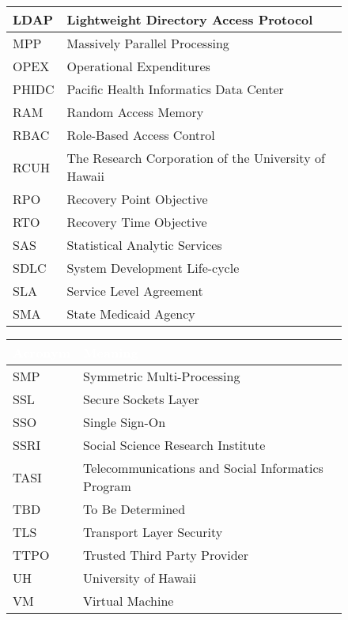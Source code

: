 \begin{figure}[H]
\begin{center}
\begin{tabular}{|>{\raggedright\arraybackslash}l 
                    |>{\raggedright\arraybackslash}l 
                    |}
    LDAP & Lightweight Directory Access Protocol\\\hline
    MPP & Massively Parallel Processing\\\hline
    OPEX & Operational Expenditures \\\hline
    PHIDC & Pacific Health Informatics Data Center\\\hline
    RAM & Random Access Memory\\\hline
    RBAC & Role-Based Access Control\\\hline
    RCUH & The Research Corporation of the University of Hawaii\\\hline
    RPO & Recovery Point Objective\\\hline
    RTO & Recovery Time Objective\\\hline
    SAS & Statistical Analytic Services\\\hline
    SDLC & System Development Life-cycle\\\hline
    SLA & Service Level Agreement \\\hline
    SMA & State Medicaid Agency\\\hline
    \end{tabular}
\end{center}
\label{AcronymsI}
\end{figure}

\begin{figure}[H]
\begin{center}
    \renewcommand{\arraystretch}{1.5}
    \begin{tabular}{|>{\raggedright\arraybackslash}l 
                    |>{\raggedright\arraybackslash}l 
                    |}
    \hline
    \rowcolor[HTML]{196fb4}\centering\textcolor{white}{\large Acronym} 
                            & \centering\textcolor{white}{\large Meaning} 
                            \tabularnewline 
    \hline
    SMP & Symmetric Multi-Processing\\\hline
    SSL & Secure Sockets Layer\\\hline
    SSO & Single Sign-On\\\hline
    SSRI & Social Science Research Institute \\\hline
    TASI & Telecommunications and Social Informatics Program \\\hline
    TBD & To Be Determined \\\hline
    TLS & Transport Layer Security\\\hline
    TTPO & Trusted Third Party Provider \\\hline
    UH & University of Hawaii \\\hline
    VM & Virtual Machine\\\hline
    \end{tabular}
\end{center}
\label{AcronymsII}
\end{figure}